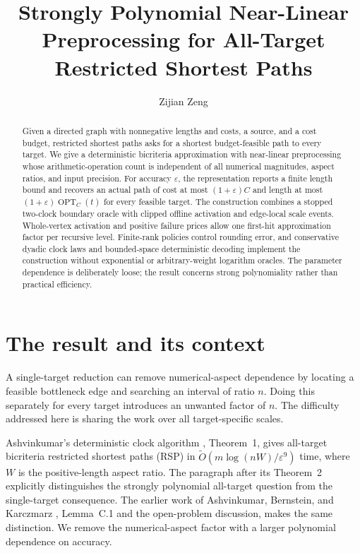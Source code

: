 \documentclass[acmsmall,11pt,screen,nonacm]{acmart}
\title[All-Target Restricted Shortest Paths]{Strongly Polynomial Near-Linear Preprocessing for All-Target Restricted Shortest Paths}
\author{Zijian Zeng}
\affiliation{\institution{UCSI University}\country{Malaysia}}
\date{}
\newcommand{\OPT}{\operatorname{OPT}}
\begin{document}
\renewcommand{\bibfont}{\normalfont\normalsize}
\begin{abstract}
\normalsize
Given a directed graph with nonnegative lengths and costs, a source, and a cost budget, restricted shortest paths asks for a shortest budget-feasible path to every target. We give a deterministic bicriteria approximation with near-linear preprocessing whose arithmetic-operation count is independent of all numerical magnitudes, aspect ratios, and input precision. For accuracy $\varepsilon$, the representation reports a finite length bound and recovers an actual path of cost at most $(1+\varepsilon)C$ and length at most $(1+\varepsilon)\OPT_C(t)$ for every feasible target. The construction combines a stopped two-clock boundary oracle with clipped offline activation and edge-local scale events. Whole-vertex activation and positive failure prices allow one first-hit approximation factor per recursive level. Finite-rank policies control rounding error, and conservative dyadic clock laws and bounded-space deterministic decoding implement the construction without exponential or arbitrary-weight logarithm oracles. The parameter dependence is deliberately loose; the result concerns strong polynomiality rather than practical efficiency.
\end{abstract}
\maketitle
\clearpage

\section{The result and its context}
A single-target reduction can remove numerical-aspect dependence by locating a feasible bottleneck edge and searching an interval of ratio $n$. Doing this separately for every target introduces an unwanted factor of $n$. The difficulty addressed here is sharing the work over all target-specific scales.

Ashvinkumar's deterministic clock algorithm \cite{A26}, Theorem~1, gives all-target bicriteria restricted shortest paths (RSP) in $\widetilde O(m\log(nW)/\varepsilon^9)$ time, where $W$ is the positive-length aspect ratio. The paragraph after its Theorem~2 explicitly distinguishes the strongly polynomial all-target question from the single-target consequence. The earlier work of Ashvinkumar, Bernstein, and Karczmarz \cite{ABK24}, Lemma~C.1 and the open-problem discussion, makes the same distinction. We remove the numerical-aspect factor with a larger polynomial dependence on accuracy.
\end{document}

